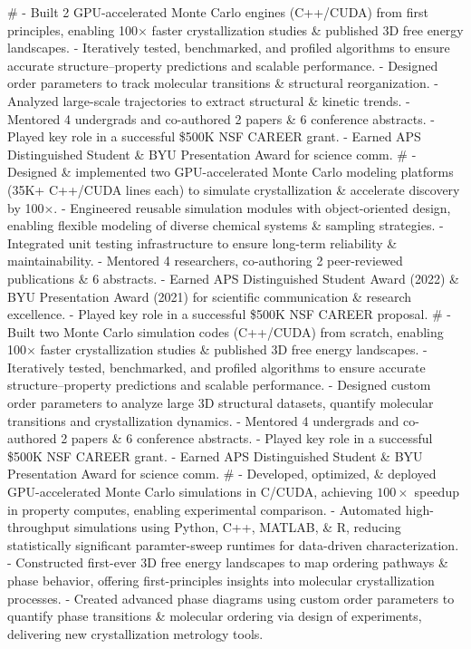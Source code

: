 #
- Built 2 GPU-accelerated Monte Carlo engines (C++/CUDA) from first principles, enabling 100$\times$ faster crystallization studies \& published 3D free energy landscapes.
- Iteratively tested, benchmarked, and profiled algorithms to ensure accurate structure–property predictions and scalable performance.
- Designed order parameters to track molecular transitions \& structural reorganization.
- Analyzed large-scale trajectories to extract structural \& kinetic trends.
- Mentored 4 undergrads and co-authored 2 papers \& 6 conference abstracts.
- Played key role in a successful \$500K NSF CAREER grant.
- Earned APS Distinguished Student \& BYU Presentation Award for science comm.
#
- Designed \& implemented two GPU-accelerated Monte Carlo modeling platforms (35K+ C++/CUDA lines each) to simulate crystallization \& accelerate discovery by 100$\times$.
- Engineered reusable simulation modules with object-oriented design, enabling flexible modeling of diverse chemical systems \& sampling strategies.
- Integrated unit testing infrastructure to ensure long-term reliability \& maintainability.
- Mentored 4 researchers, co-authoring 2 peer-reviewed publications \& 6 abstracts.
- Earned APS Distinguished Student Award (2022) \& BYU Presentation Award (2021) for scientific communication \& research excellence.
- Played key role in a successful \$500K NSF CAREER proposal.
#
- Built two Monte Carlo simulation codes (C++/CUDA) from scratch, enabling 100$\times$ faster crystallization studies \& published 3D free energy landscapes.
- Iteratively tested, benchmarked, and profiled algorithms to ensure accurate structure–property predictions and scalable performance.
- Designed custom order parameters to analyze large 3D structural datasets, quantify molecular transitions and crystallization dynamics.
- Mentored 4 undergrads and co-authored 2 papers \& 6 conference abstracts.
- Played key role in a successful \$500K NSF CAREER grant.
- Earned APS Distinguished Student \& BYU Presentation Award for science comm.
#
- Developed, optimized, \& deployed GPU-accelerated Monte Carlo simulations in C/CUDA, achieving $100\times$ speedup in property computes, enabling experimental comparison.
- Automated high-throughput simulations using Python, C++, MATLAB, \& R, reducing statistically significant paramter-sweep runtimes for data-driven characterization.
- Constructed first-ever 3D free energy landscapes to map ordering pathways \& phase behavior, offering first-principles insights into molecular crystallization processes.
- Created advanced phase diagrams using custom order parameters to quantify phase transitions \& molecular ordering via design of experiments, delivering new crystallization metrology tools.
